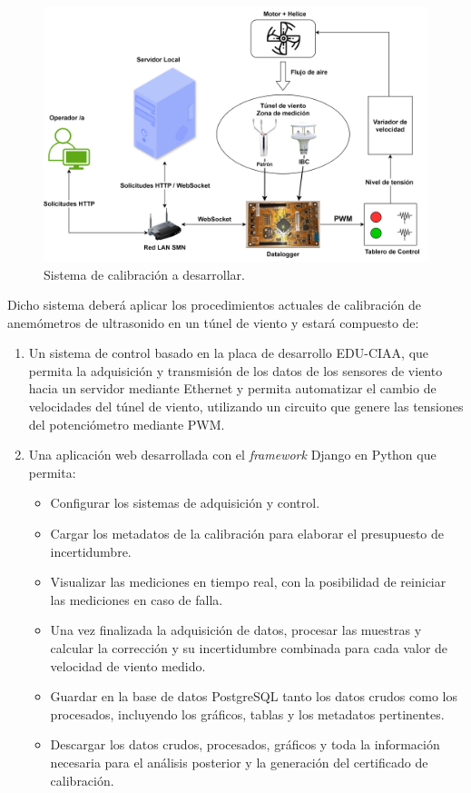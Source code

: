 \begin{figure}[H]
    \centering
    \includegraphics[width=1\linewidth]{Figuras/introduccion/sistemaDesarrollado.png}
    \caption{Sistema de calibración a desarrollar.} 
    \label{fig:sistemaDesarrollado}
\end{figure}

Dicho sistema deberá aplicar los procedimientos actuales de calibración de anemómetros de ultrasonido en un túnel de viento y estará compuesto de:
\begin{enumerate}
    \item Un sistema de control basado en la placa de desarrollo EDU-CIAA, que permita la adquisición y transmisión de los datos de los sensores de viento hacia un servidor mediante Ethernet y permita automatizar el cambio de velocidades del túnel de viento, utilizando un circuito que genere las tensiones del potenciómetro mediante PWM.
   
    \item Una aplicación web desarrollada con el \textit{framework} Django en Python que permita:
    \begin{itemize}
        \item Configurar los sistemas de adquisición y control.
        \item Cargar los metadatos de la calibración para elaborar el presupuesto de incertidumbre.
        \item Visualizar las mediciones en tiempo real, con la posibilidad de reiniciar las mediciones en caso de falla.
        \item Una vez finalizada la adquisición de datos, procesar las muestras y calcular la corrección y su incertidumbre combinada para cada valor de velocidad de viento medido.
        \item Guardar en la base de datos PostgreSQL tanto los datos crudos como los procesados, incluyendo los gráficos, tablas y los metadatos pertinentes.
        \item Descargar los datos crudos, procesados, gráficos y toda la información necesaria para el análisis posterior y la generación del certificado de calibración.
    \end{itemize}
\end{enumerate}
